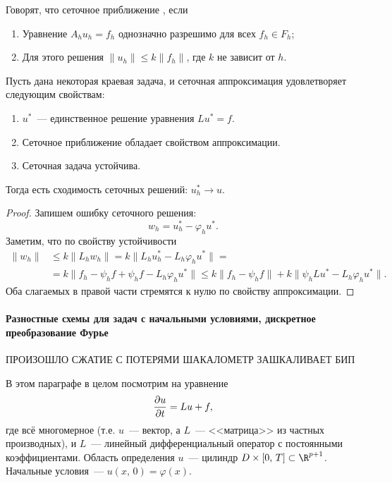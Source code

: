 \documentclass{trlnotes}
\begin{document}
	\begin{de}  
		Говорят, что сеточное приближение , если
		\begin{enumerate}
			\item Уравнение $A_hu_h = f_h$ однозначно разрешимо для всех $f_h \in F_h$;
			\item Для этого решения $\|u_h\| \leqslant k \|f_h\|$, где $k$ не зависит от $h$.
		\end{enumerate}
	\end{de}

	\begin{thm}
		Пусть дана некоторая краевая задача, и сеточная аппроксимация удовлетворяет следующим свойствам:
		\begin{enumerate}
			\item $u^*$~--- единственное решение уравнения $Lu^* = f$.
			\item Сеточное приближение обладает свойством аппроксимации.
			\item Сеточная задача устойчива.
		\end{enumerate}
		Тогда есть сходимость сеточных решений: $u^*_h \to u$.
		\begin{proof}
			Запишем ошибку сеточного решения:
			\[
				w_h = u_h^* - \varphi_h u^*.
			\]
			Заметим, что по свойству устойчивости
			\begin{align*}
				\|w_h\| &\leqslant k \|L_h w_h\| = k\|L_h u_h^* - L_h \varphi_h u^*\| = \\ &= k\|f_h - \psi_h f + \psi_h f - L_h \varphi_h u^*\| \leqslant k\|f_h - \psi_h f\| + k\|\psi_h L u^* - L_h \varphi_h u^*\|.
			\end{align*}
			Оба слагаемых в правой части стремятся к нулю по свойству аппроксимации.
		\end{proof}
	\end{thm}

	\paragraph{Разностные схемы для задач с начальными условиями, дискретное преобразование Фурье}

	\begin{rem}
		ПРОИЗОШЛО СЖАТИЕ С ПОТЕРЯМИ ШАКАЛОМЕТР ЗАШКАЛИВАЕТ БИП 
	\end{rem}

	В этом параграфе в целом посмотрим на уравнение 
	\[
		\dfrac{\partial u}{\partial t} = Lu + f,
	\]
	где всё многомерное (т.е. $u$~--- вектор, а $L$~--- <<матрица>> из частных производных), и $L$~--- линейный дифференциальный оператор с постоянными коэффициентами. Область определения $u$~--- цилиндр $D\times [0, \, T] \subset \R^{p + 1}$. Начальные условия~--- $u(x, \, 0) = \varphi(x)$.
\end{document}
